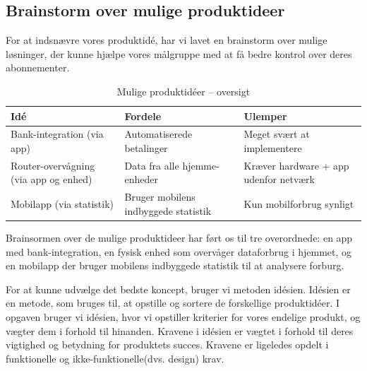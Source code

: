 \subsection{Brainstorm over mulige produktideer}
For at indsnævre vores produktidé, har vi lavet en brainstorm over mulige løsninger, der kunne hjælpe vores målgruppe med at få bedre kontrol over deres abonnementer.
\begin{table}[H]
\centering
\small
\label{tab:produktideer}
\begin{tabularx}{\textwidth}{XXX}
    \toprule
    \textbf{Idé} & \textbf{Fordele} & \textbf{Ulemper} \\
    \midrule
    Bank-integration (via app)     & Automatiserede betalinger                  & Meget svært at implementere \\
    Router-overvågning (via app og enhed)   & Data fra alle hjemme-enheder               & Kræver hardware + app udenfor netværk \\
    Mobilapp (via statistik)             & Bruger mobilens indbyggede statistik       & Kun mobilforbrug synligt \\
    \bottomrule
\end{tabularx}
\caption{Mulige produktidéer – oversigt}
\end{table} 

Brainsormen over de mulige produktideer har ført os til tre overordnede: en app med bank-integration, en fysisk enhed som overvåger dataforbrug i hjemmet, og en mobilapp der bruger mobilens indbyggede statistik til at analysere forburg. 

For at kunne udvælge det bedste koncept, bruger vi metoden idésien. Idésien er en metode, som bruges til, at opstille og sortere de forskellige produktidéer. I opgaven bruger vi idésien, hvor vi opstiller kriterier for vores endelige produkt, og vægter dem i forhold til hinanden. Kravene i idésien er vægtet i forhold til deres vigtighed og betydning for produktets succes. Kravene er ligeledes opdelt i funktionelle og ikke-funktionelle(dvs. design) krav.

